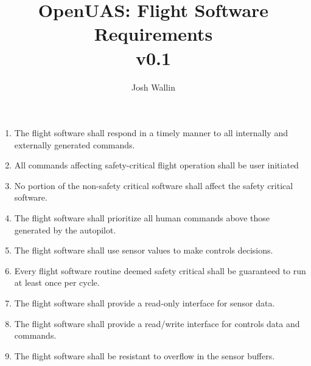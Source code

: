 \documentclass{article} %
\begin{document}
\title{OpenUAS: Flight Software Requirements\\ v0.1}

\author{Josh Wallin}

\maketitle

\begin{enumerate}

\item The flight software shall respond in a timely manner to all internally and externally generated commands.\\

\item All commands affecting safety-critical flight operation shall be user initiated\\

\item No portion of the non-safety critical software shall affect the safety critical software.\\

\item The flight software shall prioritize all human commands above those generated by the autopilot.\\

\item The flight software shall use sensor values to make controls decisions.\\

\item Every flight software routine deemed safety critical shall be guaranteed to run at least once per cycle.\\

\item The flight software shall provide a read-only interface for sensor data.\\

\item The flight software shall provide a read/write interface for controls data and commands.\\

\item The flight software shall be resistant to overflow in the sensor buffers.\\

\end{enumerate}
\end{document}
